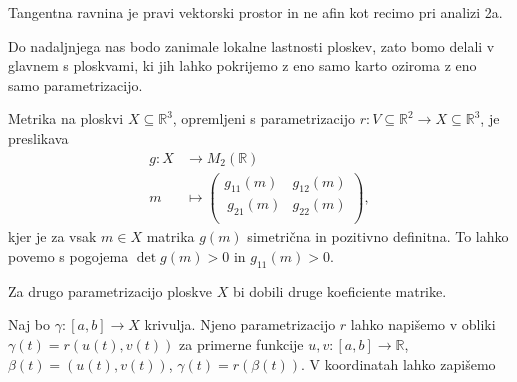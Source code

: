 \begin{opomba}
 Tangentna ravnina je pravi vektorski prostor in ne afin kot
 recimo pri analizi 2a.
\end{opomba}

Do nadaljnjega nas bodo zanimale lokalne lastnosti ploskev, zato bomo
delali v glavnem s ploskvami, ki jih lahko pokrijemo z eno samo karto
oziroma z eno samo parametrizacijo.

\begin{definicija}
\label{def_metrika_na_ploskvi}
 Metrika na ploskvi $X \subseteq  \mathbb{R}^3$, opremljeni s
 parametrizacijo $r: V \subseteq  \mathbb{R}^2 \to  X \subseteq
 \mathbb{R}^3$, je preslikava \begin{align*}
 	g: X &\longrightarrow M_2(\mathbb{R}) \\
 	m &\longmapsto 
	\begin{pmatrix}
		g_{11}(m) & g_{12}(m) \\\
		g_{21}(m) & g_{22}(m) \\
	\end{pmatrix},
 \end{align*}
 kjer je za vsak $m \in  X$ matrika $g(m)$ simetrična in pozitivno definitna. To lahko povemo s pogojema
 $\det g(m) > 0$ in $g_{11}(m) >0.$

\end{definicija}
\begin{opomba}
 Za drugo parametrizacijo ploskve $X$ bi dobili druge koeficiente
 matrike.
\end{opomba}
 Naj bo $\gamma: [a,b] \to  X$ krivulja. Njeno parametrizacijo $r$
lahko napišemo v obliki  $\gamma(t) = r(u(t), v(t))$ za primerne
funkcije $u,v : [a,b] \to \mathbb{R}$, $\beta(t) = (u(t), v(t))$,
$\gamma(t) = r(\beta(t)).$ V koordinatah lahko zapišemo 

